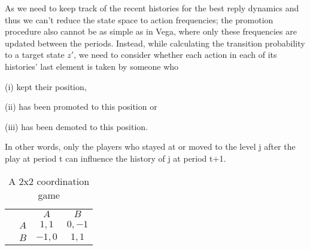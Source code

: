 \documentclass[11pt, a4paper, leqno]{article}
\begin{document}
As we need to keep track of the recent histories for the best reply dynamics and thus we can't reduce the state space to action frequencies; the promotion procedure also cannot be as simple as in Vega, where only these frequencies are updated between the periods. Instead, while calculating the transition probability to a target state $z'$, we need to consider whether each action in each of its histories' last element is taken by someone who

(i) kept their position, 

(ii) has been promoted to this position or 

(iii) has been demoted to this position. 

In other words, only the players who stayed at or moved to the level j after the play at period t can influence the history of j at period t+1. 


\begin{table}
\begin{center}
    
    \setlength{\extrarowheight}{2pt}
    \begin{tabular}{cc|c|c|}
      & \multicolumn{1}{c}{} & \multicolumn{1}{c}{$A$}  & \multicolumn{1}{c}{$B$} \\\cline{3-4}
      & $A$ & $1,1$ & $0,-1$ \\\cline{3-4}
      & $B$ & $-1,0$ & $1,1$ \\\cline{3-4}
    \end{tabular}

\end{center}
    \caption{A 2x2 coordination game}
\end{table}
\end{document}
